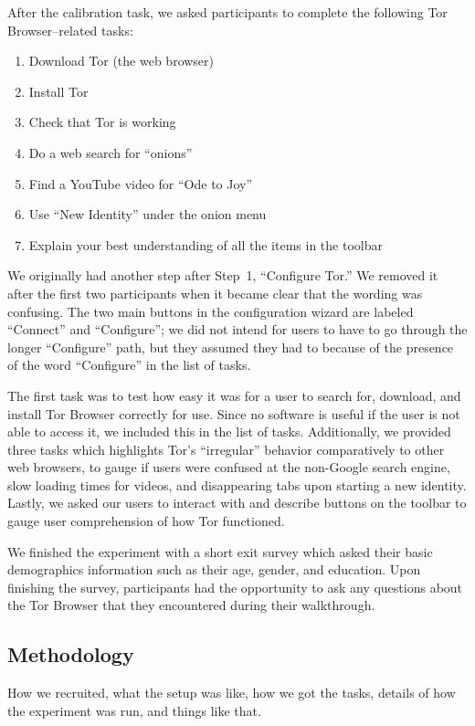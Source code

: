 \documentclass[letterpaper,twocolumn,11pt]{article}
\begin{document}
After the calibration task, we asked participants to complete
the following Tor Browser--related tasks: 

\begin{enumerate} \itemsep1pt \parskip0pt 
\item Download Tor (the web browser)
\item Install Tor
\item Check that Tor is working
\item Do a web search for ``onions''
\item Find a YouTube video for ``Ode to Joy''
\item Use ``New Identity'' under the onion menu
\item Explain your best understanding of all the items in the toolbar
\end{enumerate}

We originally had another step after Step~1, ``Configure Tor.''
We removed it after the first two participants
when it became clear that the wording was confusing.
The two main buttons in the configuration wizard are labeled
``Connect'' and ``Configure''; we did not intend for users
to have to go through the longer ``Configure'' path,
but they assumed they had to because of the presence
of the word ``Configure'' in the list of tasks.

The first task was to test how easy it was for a user to search for, download, and install Tor Browser correctly for use. Since no software is useful if the user is not able to access it, we included this in the list of tasks.
Additionally, we provided three tasks which highlights Tor's ``irregular'' behavior comparatively to other
web browsers, to gauge if users were confused at the non-Google search engine, slow loading
times for videos, and disappearing tabs upon starting a new identity. Lastly, we asked our users to 
interact with and describe buttons on the toolbar to gauge user comprehension of how Tor functioned.

We finished the experiment with a short exit survey which asked their basic demographics information 
such as their age, gender, and education. Upon finishing the survey, participants had the opportunity to 
ask any questions about the Tor Browser that they encountered during their walkthrough. 

\subsection{Methodology}
{\color {red} How we recruited, what the setup was like, how we got the tasks, details of 
how the experiment was run, and things like that.}
\end{document}
